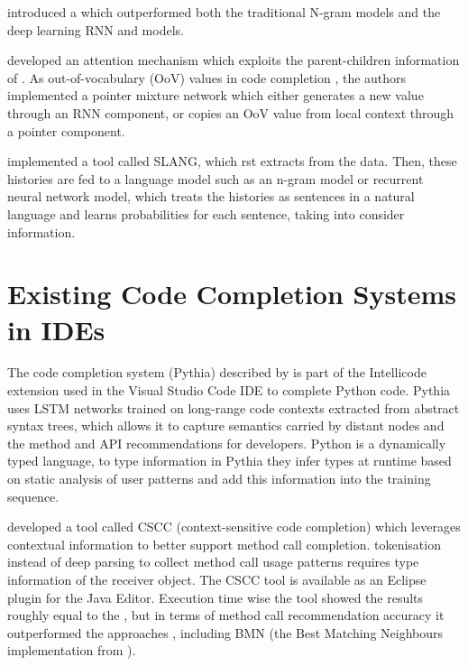 \cite{Hell17a} introduced a   which outperformed both the traditional N-gram models and the deep learning RNN and   models.

\cite{Li17a} developed an attention mechanism which exploits the parent-children information of . As  out-of-vocabulary (OoV) values in code completion , the authors implemented a pointer mixture network which either generates a new value through an RNN component, or copies an OoV value from local context through a pointer component.

\cite{Rayc14a} implemented a tool called SLANG, which rst  extracts  from the data. Then, these histories are fed to a language model such as an n-gram model or recurrent neural network model, which treats the histories as sentences in a natural language and learns probabilities for each sentence,  taking into consider  information.

\section{Existing Code Completion Systems in IDEs}
\label{sec:RelatedWorks-ExistingSystems}
The code completion system (Pythia) described by \cite{Svya19a} is part of the Intellicode extension used in the Visual Studio Code IDE to complete Python code. Pythia uses LSTM networks trained on long-range code contexts extracted from abstract syntax trees, which allows it to capture semantics carried by distant nodes and  the method and API recommendations for developers.  Python is a dynamically typed language,  to   type information in Pythia they infer types at runtime based on static analysis of user patterns and add this information into the training sequence.

\cite{Asad14a} developed a tool called CSCC (context-sensitive code completion) which leverages contextual information to better support method call completion.  tokenisation instead of deep parsing to collect method call usage patterns requires type information of the receiver object. The CSCC tool is available as an Eclipse plugin for the Java Editor. Execution time wise the tool showed the results roughly equal to the , but in terms of method call recommendation accuracy it outperformed the  approaches , including BMN (the Best Matching Neighbours implementation from \cite{Bruc09a}).

